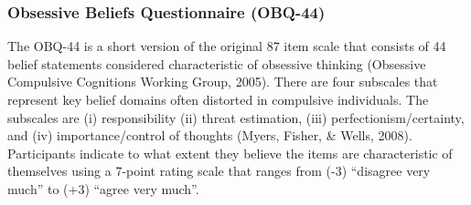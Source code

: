 \subsubsection{Obsessive Beliefs Questionnaire (OBQ-44)}
The OBQ-44 is a short version of the original 87 item scale that consists of 44 belief statements considered characteristic of obsessive thinking (Obsessive Compulsive Cognitions Working Group, 2005). There are four subscales that represent key belief domains often distorted in compulsive individuals. The subscales are (i) responsibility (ii) threat estimation, (iii) perfectionism/certainty, and (iv) importance/control of thoughts (Myers, Fisher, & Wells, 2008). Participants indicate to what extent they believe the items are characteristic of themselves using a 7-point rating scale that ranges from (-3) “disagree very much” to (+3) “agree very much”.


